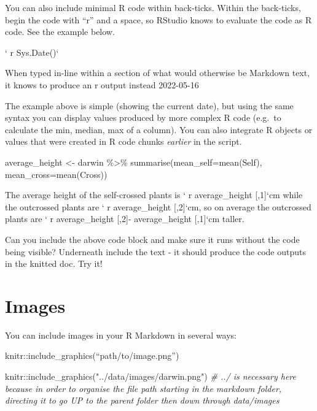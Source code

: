 \documentclass[
]{book}
\makeatletter
\newenvironment{Shaded}{\begin{snugshade}}{\end{snugshade}}
\newcommand{\AttributeTok}[1]{\textcolor[rgb]{0.77,0.63,0.00}{#1}}
\newcommand{\CommentTok}[1]{\textcolor[rgb]{0.56,0.35,0.01}{\textit{#1}}}
\newcommand{\FunctionTok}[1]{\textcolor[rgb]{0.00,0.00,0.00}{#1}}
\newcommand{\NormalTok}[1]{#1}
\newcommand{\OtherTok}[1]{\textcolor[rgb]{0.56,0.35,0.01}{#1}}
\newcommand{\SpecialCharTok}[1]{\textcolor[rgb]{0.00,0.00,0.00}{#1}}
\newcommand{\StringTok}[1]{\textcolor[rgb]{0.31,0.60,0.02}{#1}}
\newenvironment{kframe}{%
\medskip{}
\setlength{\fboxsep}{.8em}
 \def\at@end@of@kframe{}%
 \ifinner\ifhmode%
  \def\at@end@of@kframe{\end{minipage}}%
  \begin{minipage}{\columnwidth}%
 \fi\fi%
 \def\FrameCommand##1{\hskip\@totalleftmargin \hskip-\fboxsep
 \colorbox{shadecolor}{##1}\hskip-\fboxsep
     \hskip-\linewidth \hskip-\@totalleftmargin \hskip\columnwidth}%
 \MakeFramed {\advance\hsize-\width
   \@totalleftmargin\z@ \linewidth\hsize
   \@setminipage}}%
 {\par\unskip\endMakeFramed%
 \at@end@of@kframe}
\newenvironment{block}[1]
  {
  \begin{itemize}
  \renewcommand{\labelitemi}{
    \raisebox{-.7\height}[0pt][0pt]{
      {\setkeys{Gin}{width=3em,keepaspectratio}\texttt{[image: images/\#1]}}
    }
  }
  \setlength{\fboxsep}{1em}
  \begin{kframe}
  \item
  }
  {
  \end{kframe}
  \end{itemize}
  }
\newenvironment{rmdquestion}
  {\begin{block}{question}}
  {\end{block}}
\makeatother
\begin{document}
You can also include minimal R code within back-ticks. Within the back-ticks, begin the code with ``r'' and a space, so RStudio knows to evaluate the code as R code. See the example below.

` r Sys.Date()`

When typed in-line within a section of what would otherwise be Markdown text, it knows to produce an r output instead 2022-05-16

The example above is simple (showing the current date), but using the same syntax you can display values produced by more complex R code (e.g.~to calculate the min, median, max of a column). You can also integrate R objects or values that were created in R code chunks \emph{earlier} in the script.

\begin{Shaded}
\begin{Highlighting}[]
\NormalTok{average\_height }\OtherTok{\textless{}{-}}\NormalTok{ darwin }\SpecialCharTok{\%\textgreater{}\%} 
  \FunctionTok{summarise}\NormalTok{(}\AttributeTok{mean\_self=}\FunctionTok{mean}\NormalTok{(Self),}
            \AttributeTok{mean\_cross=}\FunctionTok{mean}\NormalTok{(Cross))}
\end{Highlighting}
\end{Shaded}

The average height of the self-crossed plants is ` r average\_height {[},1{]}`cm while the outcrossed plants are ` r average\_height {[},2{]}`cm, so on average the outcrossed plants are ` r average\_height {[},2{]}- average\_height {[},1{]}`cm taller.

\begin{rmdquestion}
Can you include the above code block and make sure it runs without the
code being visible? Underneath include the text - it should produce the
code outputs in the knitted doc. Try it!
\end{rmdquestion}

\hypertarget{images}{%
\section{Images}\label{images}}

You can include images in your R Markdown in several ways:

knitr::include\_graphics(``path/to/image.png'')

\begin{Shaded}
\begin{Highlighting}[]
\NormalTok{knitr}\SpecialCharTok{::}\FunctionTok{include\_graphics}\NormalTok{(}\StringTok{"../data/images/darwin.png"}\NormalTok{)}
\CommentTok{\# ../ is necessary here because in order to organise the file path starting in the markdown folder, directing it to go UP to the parent folder then down through data/images}
\end{Highlighting}
\end{Shaded}
\end{document}
